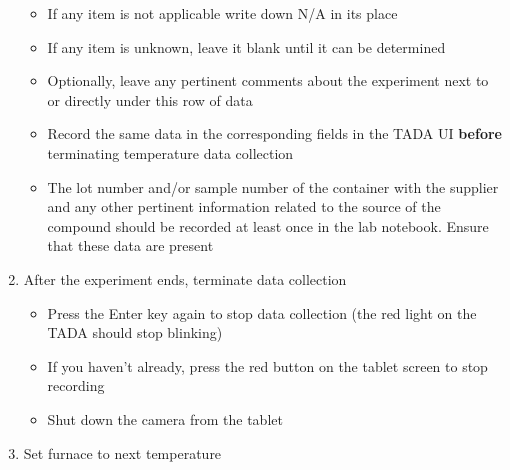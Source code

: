 \documentclass[letterpaper,11pt]{article}
\begin{document}
\begin{enumerate}
\begin{itemize}
        \item If any item is not applicable write down N/A in its place
        \item If any item is unknown, leave it blank until it can be determined
        \item Optionally, leave any pertinent comments about the experiment
            next to or directly under this row of data
        \item Record the same data in the corresponding fields in the TADA UI
            \textbf{before} terminating temperature data collection
        \item The lot number and/or sample number of the container with the 
            supplier and any other pertinent information related to the source
            of the compound should be recorded at least once in the lab 
            notebook. Ensure that these data are present
        \end{itemize}
        
    \item After the experiment ends, terminate data collection
        \begin{itemize}
        \item Press the Enter key  again to stop data 
            collection (the red light on the TADA should stop blinking)
        \item If you haven't already, press the red button on the tablet screen 
        to stop recording
        \item Shut down the camera from the tablet
        \end{itemize}
        
    \item Set furnace to next temperature


\end{enumerate}
\end{document}
